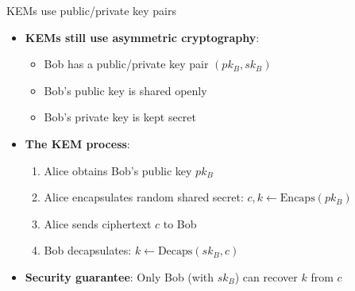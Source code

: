 \documentclass[aspectratio=169, lualatex]{beamer} %
\begin{document}
\begin{frame}{KEMs use public/private key pairs}
	\begin{itemize}
		\item \textbf{KEMs still use asymmetric cryptography}:
		      \begin{itemize}
			      \item Bob has a public/private key pair $(pk_B, sk_B)$
			      \item Bob's public key is shared openly
			      \item Bob's private key is kept secret
		      \end{itemize}\pause
		\item \textbf{The KEM process}:
		      \begin{enumerate}
			      \item Alice obtains Bob's public key $pk_B$
			      \item Alice encapsulates random shared secret: $c, k \gets \text{Encaps}(pk_B)$
			      \item Alice sends ciphertext $c$ to Bob
			      \item Bob decapsulates: $k \gets \text{Decaps}(sk_B, c)$
		      \end{enumerate}
		\item \textbf{Security guarantee}: Only Bob (with $sk_B$) can recover $k$ from $c$
	\end{itemize}
\end{frame}
\end{document}
